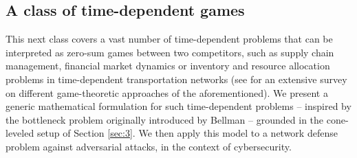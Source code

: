 \documentclass[11pt, twoside]{article}
\numberwithin{equation}{section}
\theoremstyle{definition}
\begin{document}
\vspace{-0.1cm} \subsection{A class of time-dependent games}\vspace{-0.2cm} 

This next class covers a vast number of time-dependent problems that can be interpreted as zero-sum games between two competitors, such as supply chain management, financial market dynamics or inventory and resource allocation problems in time-dependent transportation networks (see \cite{cachon2006game} for an extensive survey on different game-theoretic approaches of the aforementioned). We present a generic mathematical formulation for such time-dependent problems -- inspired by the bottleneck problem originally introduced by Bellman \cite{bellman1966dynamic} -- grounded in the cone-leveled setup of Section \ref{sec:3}. We then apply this model to a network defense problem against adversarial attacks, in the context of cybersecurity.\par
\end{document}
